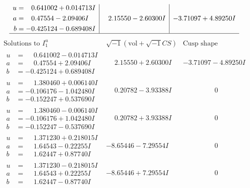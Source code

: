 \documentclass[1p]{elsarticle_modified}
\theoremstyle{definition}
\newcommand{\I}{\sqrt{-1}}
\begin{document}
$$\begin{array}{c|c|c}
\begin{aligned}
u &= \phantom{-}0.641002 + 0.014713 I \\
a &= \phantom{-}0.47554 - 2.09406 I \\
b &= -0.425124 - 0.689408 I\end{aligned}
 & \phantom{-}2.15550 - 2.60300 I & -3.71097 + 4.89250 I\\
 \hline 
 \end{array}$$\newpage$$\begin{array}{c|c|c}  
\text{Solutions to }I^u_{1}& \I (\text{vol} + \sqrt{-1}CS) & \text{Cusp shape}\\
 \hline 
\begin{aligned}
u &= \phantom{-}0.641002 - 0.014713 I \\
a &= \phantom{-}0.47554 + 2.09406 I \\
b &= -0.425124 + 0.689408 I\end{aligned}
 & \phantom{-}2.15550 + 2.60300 I & -3.71097 - 4.89250 I \\ \hline\begin{aligned}
u &= \phantom{-}1.380460 + 0.006140 I \\
a &= -0.106176 - 1.042480 I \\
b &= -0.152247 + 0.537690 I\end{aligned}
 & \phantom{-}0.20782 - 3.93388 I & \phantom{-0.000000 } 0 \\ \hline\begin{aligned}
u &= \phantom{-}1.380460 - 0.006140 I \\
a &= -0.106176 + 1.042480 I \\
b &= -0.152247 - 0.537690 I\end{aligned}
 & \phantom{-}0.20782 + 3.93388 I & \phantom{-0.000000 } 0 \\ \hline\begin{aligned}
u &= \phantom{-}1.371230 + 0.218015 I \\
a &= \phantom{-}1.64543 - 0.22255 I \\
b &= \phantom{-}1.62447 + 0.87740 I\end{aligned}
 & -8.65446 - 7.29554 I & \phantom{-0.000000 } 0 \\ \hline\begin{aligned}
u &= \phantom{-}1.371230 - 0.218015 I \\
a &= \phantom{-}1.64543 + 0.22255 I \\
b &= \phantom{-}1.62447 - 0.87740 I\end{aligned}
 & -8.65446 + 7.29554 I & \phantom{-0.000000 } 0 \\ \hline\begin{aligned}

\end{aligned}
\end{array}$$
\end{document}
